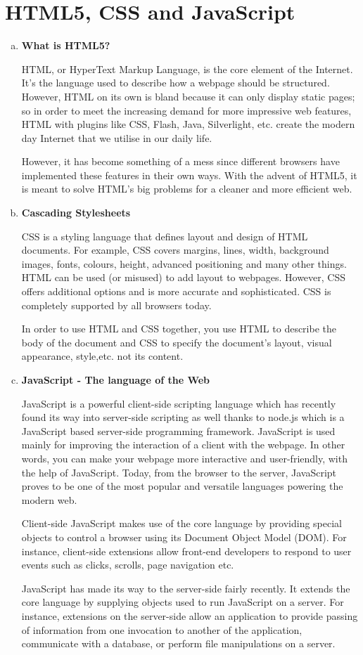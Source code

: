 \documentclass[paper.tex]{subfiles}
\begin{document}
\section{HTML5, CSS and JavaScript}
\begin{enumerate}[a.]
\item \textbf{What is HTML5?}
  \par
    HTML, or HyperText Markup Language, is the core element of the Internet. It’s the language used to describe how a webpage should be structured. However, HTML on its own is bland because it can only display static pages; so in order to meet the increasing demand for more impressive web features, HTML with plugins like CSS, Flash, Java, Silverlight, etc. create the modern day Internet that we utilise in our daily life.

    However, it has become something of a mess since different browsers have implemented these features in their own ways. With the advent of HTML5, it is meant to solve HTML’s big problems for a cleaner and more efficient web.
\item \textbf{Cascading Stylesheets}
  \par
    CSS is a styling language that defines layout and design of HTML documents. For example, CSS covers margins, lines, width, background images, fonts, colours, height, advanced positioning and many other things.
    HTML can be used (or misused) to add layout to webpages. However, CSS offers additional options and is more accurate and sophisticated. CSS is completely supported by all browsers today.

    In order to use HTML and CSS together, you use HTML to describe the body of the document and CSS to specify the document's layout, visual appearance, style,etc. not its content.
\item \textbf{JavaScript - The language of the Web}
  \par
    JavaScript is a powerful client-side scripting language which has recently found its way into server-side scripting as well thanks to node.js which is a JavaScript based server-side programming framework. JavaScript is used mainly for improving the interaction of a client with the webpage. In other words, you can make your webpage more interactive and user-friendly, with the help of JavaScript.
    Today, from the browser to the server, JavaScript proves to be one of the most popular and versatile languages powering the modern web.

    Client-side JavaScript makes use of the core language by providing special objects to control a browser using its Document Object Model (DOM). For instance, client-side extensions allow front-end developers to respond to user events such as clicks, scrolls, page navigation etc.

    JavaScript has made its way to the server-side fairly recently. It extends the core language by supplying objects used to run JavaScript on a server. For instance, extensions on the server-side allow an application to provide passing of information from one invocation to another of the application, communicate with a database, or perform file manipulations on a server.
\end{enumerate}
\end{document}

